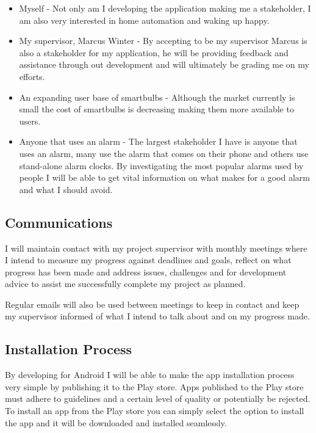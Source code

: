 \begin{itemize}
\item
  Myself - Not only am I developing the application making me a
  stakeholder, I am also very interested in home automation and waking
  up happy.
\item
  My supervisor, Marcus Winter - By accepting to be my supervisor Marcus
  is also a stakeholder for my application, he will be providing
  feedback and assistance through out development and will ultimately be
  grading me on my efforts.
\item
  An expanding user base of smartbulbs - Although the market currently
  is small the cost of smartbulbs is decreasing making them more
  available to users.
\item
  Anyone that uses an alarm - The largest stakeholder I have is anyone
  that uses an alarm, many use the alarm that comes on their phone and
  others use stand-alone alarm clocks. By investigating the most popular
  alarms used by people I will be able to get vital information on what
  makes for a good alarm and what I should avoid.
\end{itemize}

\subsection{Communications}\label{communications}

I will maintain contact with my project supervisor with monthly meetings
where I intend to measure my progress against deadlines and goals,
reflect on what progress has been made and address issues, challenges
and for development advice to assist me successfully complete my project
as planned.

Regular emails will also be used between meetings to keep in contact and
keep my supervisor informed of what I intend to talk about and on my
progress made.

\subsection{Installation Process}\label{installation-process}

By developing for Android I will be able to make the app installation
process very simple by publishing it to the Play store. Apps published
to the Play store must adhere to guidelines and a certain level of
quality or potentially be rejected. To install an app from the Play
store you can simply select the option to install the app and it will be
downloaded and installed seamlessly.

